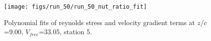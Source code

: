 \begin{figure}[H]
\centering
\texttt{[image: figs/run\_50/run\_50\_nut\_ratio\_fit]}
\caption{Polynomial fits of reynolds stress and velocity gradient terms at $z/c$=9.00, $V_{free}$=33.05, station 5.}
\label{fig:run_50_nut_ratio_fit}
\end{figure}


